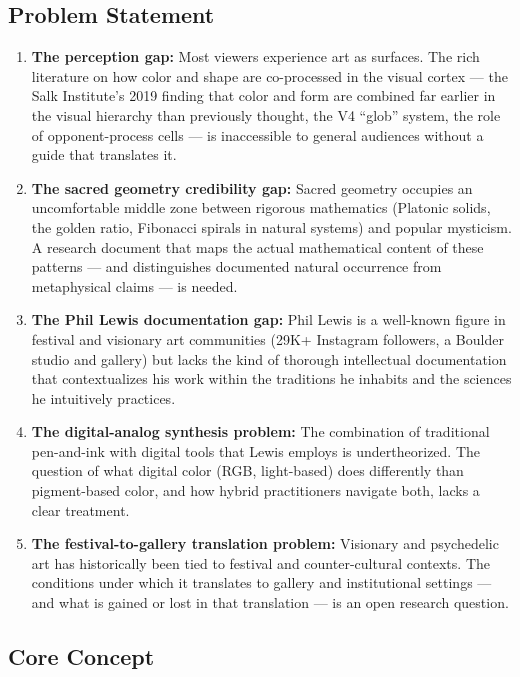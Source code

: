 \documentclass[11pt,letterpaper]{article}
\begin{document}
\subsection{Problem Statement}

\begin{enumerate}
  \item \textbf{The perception gap:} Most viewers experience art as surfaces. The rich literature on how color and shape are co-processed in the visual cortex --- the Salk Institute's 2019 finding that color and form are combined far earlier in the visual hierarchy than previously thought, the V4 ``glob'' system, the role of opponent-process cells --- is inaccessible to general audiences without a guide that translates it.
  \item \textbf{The sacred geometry credibility gap:} Sacred geometry occupies an uncomfortable middle zone between rigorous mathematics (Platonic solids, the golden ratio, Fibonacci spirals in natural systems) and popular mysticism. A research document that maps the actual mathematical content of these patterns --- and distinguishes documented natural occurrence from metaphysical claims --- is needed.
  \item \textbf{The Phil Lewis documentation gap:} Phil Lewis is a well-known figure in festival and visionary art communities (29K+ Instagram followers, a Boulder studio and gallery) but lacks the kind of thorough intellectual documentation that contextualizes his work within the traditions he inhabits and the sciences he intuitively practices.
  \item \textbf{The digital-analog synthesis problem:} The combination of traditional pen-and-ink with digital tools that Lewis employs is undertheorized. The question of what digital color (RGB, light-based) does differently than pigment-based color, and how hybrid practitioners navigate both, lacks a clear treatment.
  \item \textbf{The festival-to-gallery translation problem:} Visionary and psychedelic art has historically been tied to festival and counter-cultural contexts. The conditions under which it translates to gallery and institutional settings --- and what is gained or lost in that translation --- is an open research question.
\end{enumerate}

\subsection{Core Concept}
\end{document}
